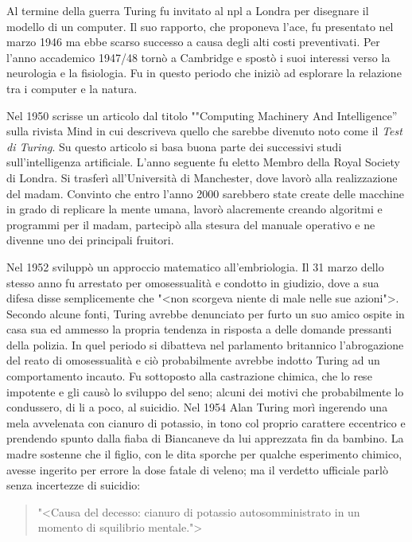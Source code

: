 Al  termine della guerra Turing fu invitato al \ac{npl} a Londra per disegnare il modello di un computer. Il suo rapporto, che proponeva l'\ac{ace}, fu presentato nel marzo 1946 ma ebbe scarso successo a causa degli alti costi preventivati. Per l'anno accademico 1947/48 tornò a Cambridge e spostò i suoi interessi verso la neurologia e la fisiologia. Fu in questo periodo che iniziò ad esplorare la relazione tra i computer e la natura.

Nel  1950 scrisse un articolo dal titolo ""Computing Machinery And Intelligence'' sulla rivista Mind in cui descriveva quello che sarebbe divenuto noto come il \emph{Test di Turing}. Su questo articolo si basa buona parte dei successivi studi sull'intelligenza artificiale.
L'anno seguente fu eletto Membro della Royal Society di Londra. Si trasferì all'Università di Manchester, dove lavorò alla realizzazione del \ac{madam}. Convinto che entro l'anno 2000 sarebbero state create delle macchine in grado di replicare la mente umana, lavorò alacremente creando algoritmi e programmi per il \ac{madam}, partecipò alla stesura del manuale operativo e ne divenne uno dei principali fruitori.

Nel  1952 sviluppò un approccio matematico all'embriologia. Il 31 marzo dello stesso anno fu arrestato per omosessualità e condotto in giudizio, dove a sua difesa disse semplicemente che "<non scorgeva niente di male nelle sue azioni">. Secondo alcune fonti, Turing avrebbe denunciato per furto un suo amico ospite in casa sua ed ammesso la propria tendenza in risposta a delle domande pressanti della polizia. In quel periodo si dibatteva nel parlamento britannico l'abrogazione del reato di omosessualità e ciò probabilmente avrebbe indotto Turing ad un comportamento incauto. Fu sottoposto alla castrazione chimica, che lo rese impotente e gli causò lo sviluppo del seno; alcuni dei motivi che probabilmente lo condussero, di li a poco, al suicidio.
Nel 1954 Alan Turing morì ingerendo una mela avvelenata con cianuro di potassio, in tono col proprio carattere eccentrico e prendendo spunto dalla fiaba di Biancaneve da lui apprezzata fin da bambino. La madre sostenne che il figlio, con le dita sporche per qualche esperimento chimico, avesse ingerito per errore la dose fatale di veleno; ma il verdetto ufficiale parlò senza incertezze di suicidio:
\begin{quote}
"<Causa del decesso: cianuro di potassio autosomministrato in un momento di squilibrio mentale.">
\end{quote}


